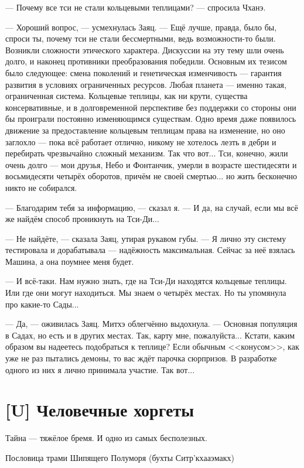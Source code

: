 --- Почему все тси не стали кольцевыми теплицами? --- спросила Чханэ.

--- Хороший вопрос, --- усмехнулась Заяц.
--- Ещё лучше, правда, было бы, спроси ты, почему тси не стали бессмертными, ведь возможности-то были.
Возникли сложности этического характера.
Дискуссии на эту тему шли очень долго, и наконец противники преобразования победили.
Основным их тезисом было следующее: смена поколений и генетическая изменчивость --- гарантия развития в условиях ограниченных ресурсов.
Любая планета --- именно такая, ограниченная система.
Кольцевые теплицы, как ни крути, существа консервативные, и в долговременной перспективе без поддержки со стороны они бы проиграли постоянно изменяющимся существам.
Одно время даже появилось движение за предоставление кольцевым теплицам права на изменение, но оно заглохло --- пока всё работает отлично, никому не хотелось лезть в дебри и перебирать чрезвычайно сложный механизм.
Так что вот...
Тси, конечно, жили очень долго --- мои друзья, Небо и Фонтанчик, умерли в возрасте шестидесяти и восьмидесяти четырёх оборотов\FM, причём не своей смертью... но жить бесконечно никто не собирался.

--- Благодарим тебя за информацию, --- сказал я.
--- И да, на случай, если мы всё же найдём способ проникнуть на Тси-Ди...

--- Не найдёте, --- сказала Заяц, утирая рукавом губы.
--- Я лично эту систему тестировала и дорабатывала --- надёжность максимальная.
Сейчас за неё взялась Машина, а она поумнее меня будет.

--- И всё-таки.
Нам нужно знать, где на Тси-Ди находятся кольцевые теплицы.
Или где они могут находиться.
Мы знаем о четырёх местах.
Но ты упомянула про какие-то Сады...

--- Да, --- оживилась Заяц.
Митхэ облегчённо выдохнула.
--- Основная популяция в Садах, но есть и в других местах.
Так, карту мне, пожалуйста...
Кстати, каким образом вы надеетесь подобраться к теплице?
Если обычным <<конусом>>, как уже не раз пытались демоны, то вас ждёт парочка сюрпризов.
В разработке одного из них я лично принимала участие.
Так вот...

\section{[U] Человечные хоргеты}

\epigraph
{Тайна --- тяжёлое бремя.
И одно из самых бесполезных.}
{Пословица трами Шипящего Полуморя (бухты Ситр'кхааэмакх)}

